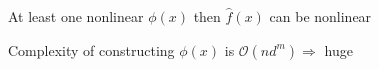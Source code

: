 At least one nonlinear $\phi(x)$ then $\hat{f}(x)$ can be nonlinear

Complexity of constructing $\phi(x)$ is $\mathcal{O}(nd^m) \Rightarrow$ huge






